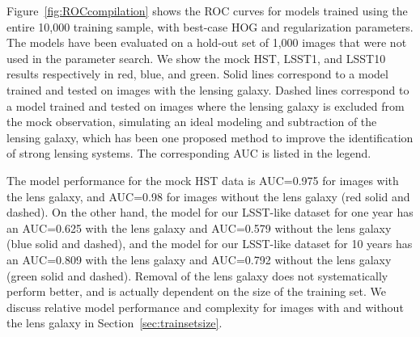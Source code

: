 \documentclass{emulateapj}
\begin{document}
Figure~\ref{fig:ROCcompilation} shows the ROC curves for models
trained using the entire 10,000 training sample, with best-case HOG
and regularization parameters.  The models have been evaluated on a
hold-out set of 1,000 images that were not used in the parameter
search.  We show the mock HST, LSST1, and LSST10 results respectively
in red, blue, and green.  Solid lines correspond to a model trained
and tested on images with the lensing galaxy.  Dashed lines correspond
to a model trained and tested on images where the lensing galaxy is
excluded from the mock observation, simulating an ideal modeling and
subtraction of the lensing galaxy, which has been one proposed method
to improve the identification of strong lensing systems.  The
corresponding AUC is listed in the legend.

The model performance for the mock HST data is AUC=0.975 for images
with the lens galaxy, and AUC=0.98 for images without the lens galaxy
(red solid and dashed).  On the other hand, the model for our
LSST-like dataset for one year has an AUC=0.625 with the lens galaxy
and AUC=0.579 without the lens galaxy (blue solid and dashed), and the
model for our LSST-like dataset for 10 years has an AUC=0.809 with the
lens galaxy and AUC=0.792 without the lens galaxy (green solid and
dashed).  Removal of the lens galaxy does not systematically perform
better, and is actually dependent on the size of the training set.  We
discuss relative model performance and complexity for images with and
without the lens galaxy in Section~\ref{sec:trainsetsize}.  
\end{document}

